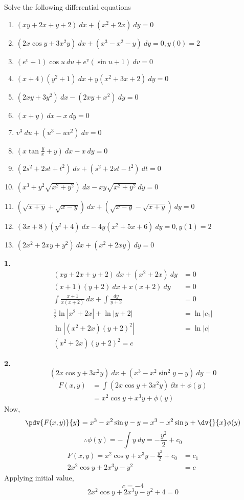 \begin{exercise}{Solve the following differential equations
    \begin{enumerate}
        \item $(xy + 2x + y + 2) \: d{x} + (x^2 + 2x) \: d{y} = 0$ \\
        \item $(2x\cos{y} + 3x^2y) \: d{x} + (x^3 - x^2 - y) \: d{y} = 0, y(0)=2$ \\
        \item $(e^v+1)\cos{u} \: d{u} + e^v(\sin{u}+1) \: d{v} = 0$
        \item $(x+4)(y^2+1) \: d{x} + y(x^2+3x+2) \: d{y} = 0$
        \item $(2xy + 3y^2) \: d{x} - (2xy + x^2) \: d{y} = 0$
        \item $(x+y) \: d{x} - x \: d{y} = 0$
        \item $v^3 \: d{u} + (u^3-uv^2) \: d{v} = 0$
        \item $\left( x\tan\frac{y}{x} + y \right) \: d{x} - x \: d{y} = 0$
        \item $(2s^2+2st+t^2) \: d{s} + (s^2+2st-t^2) \: d{t} = 0$
        \item $(x^3+y^2 \sqrt{x^2+y^2}) \: d{x} - xy \sqrt{x^2+y^2} \: d{y} = 0$
        \item $(\sqrt{x+y} + \sqrt{x-y}) \: d{x} + (\sqrt{x-y} - \sqrt{x+y}) \: d{y} = 0$
        \item $(3x+8)(y^2+4) \: d{x} - 4y(x^2+5x+6) \: d{y} = 0, y(1)=2$
        \item $(2x^2+2xy+y^2) \: d{x} + (x^2+2xy) \: d{y} = 0$
    \end{enumerate}
}{}
    \textbf{1.}
    \begin{align*}
        (xy + 2x + y + 2) \: d{x} + (x^2 + 2x) \: d{y} &= 0 \\
        (x+1)(y+2) \: d{x} + x(x+2) \: d{y} &= 0 \\
        \int{\frac{x+1}{x(x+2)}} \: d{x} + \int{\frac{dy}{y+2}} &= 0 \\
        \frac{1}{2}\ln|x^2+2x| + \ln|y+2| &= \ln|c_1| \\
        \ln|(x^2+2x)(y+2)^2| &= \ln|c| \\
        \boxed{(x^2+2x)(y+2)^2 = c}
    \end{align*}

    \textbf{2.}
    \[ (2x\cos{y} + 3x^2y) \: d{x} + (x^3 - x^2\sin^2{y} - y) \: d{y} = 0 \]
    \begin{align*}
        F(x,y) &= \int{(2x\cos{y} + 3x^2y)} \: \partial{x} + \phi(y) \\
               &= x^2\cos{y} + x^3y + \phi(y)
    \end{align*}
    Now, \[
        \pdv{F(x,y)}{y} = x^3 - x^2\sin y - y = x^3 - x^2\sin y + \dv{}{x}\phi(y)
    \] \[
        \therefore \phi(y) = -\int{y} \: d{y} = -\frac{y^2}{2} + c_0
    \]
    \begin{align*}
        F(x,y) = x^2\cos y + x^3y - \frac{y^2}{2} + c_0 &= c_1 \\
        2x^2\cos y + 2x^3y - y^2 &= c
    \end{align*}
    Applying initial value, \[ c = -4 \]
    \[ \boxed{2x^2\cos y + 2x^3y - y^2 + 4 = 0} \]


\end{exercise}

